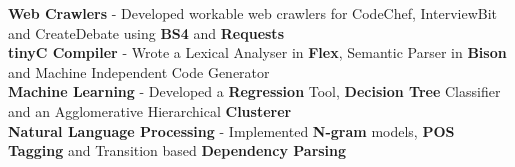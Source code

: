 \documentclass[10pt]{article}
\begin{document}
\vspace{-2.2ex}
\spacedhrule{0.15ex}{1.0ex}
\begin{indentsection}
    \smaller\href{https://github.com/shmundhra?tab=repositories}     {\faGithub}\hspace{0.5ex}\normalsize \textbf{Web Crawlers} {\hfill}{- Developed workable web crawlers for CodeChef, InterviewBit and CreateDebate using \textbf{BS4} and \textbf{Requests}}
    \\[0.05em] \smaller\href{https://github.com/shmundhra/tinyC-Compiler}     {\faGithub}\hspace{0.5ex}\normalsize \textbf{tinyC Compiler} {\hfill}{- Wrote a Lexical Analyser in \textbf{Flex}, Semantic Parser in \textbf{Bison} and Machine Independent Code Generator}
    \\[0.05em] \smaller\href{https://github.com/shmundhra/Machine-Learning} {\faGithub}\hspace{0.5ex}\normalsize \textbf{Machine Learning} {\hfill}{- Developed a \textbf{Regression} Tool, \textbf{Decision Tree} Classifier and an Agglomerative Hierarchical \textbf{Clusterer}}
    \\[0.05em] \smaller\href{https://github.com/shmundhra/Natural-Language-Processing} {\faGithub}\hspace{0.5ex}\normalsize \textbf{Natural Language Processing} {\hfill}{- Implemented \textbf{N-gram} models, \textbf{POS Tagging} and Transition based \textbf{Dependency Parsing}} 
\end{indentsection}
\end{document}
